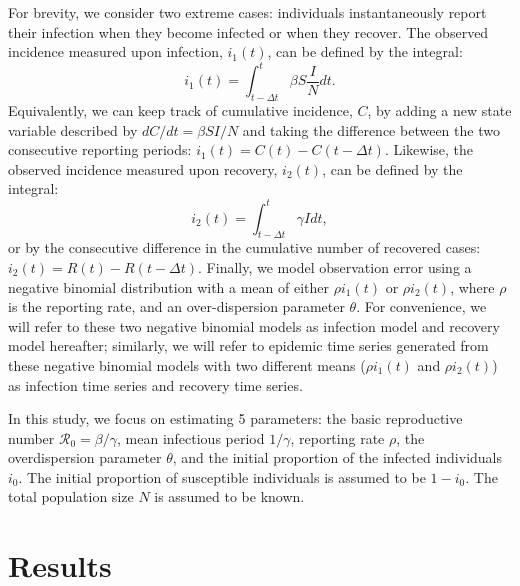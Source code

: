 \documentclass[12pt]{article}\usepackage[]{graphicx}\usepackage[]{color}
\begin{document}
For brevity, we consider two extreme cases: individuals instantaneously report
their infection when they become infected or when they recover. The observed incidence 
measured upon infection, $i_1(t)$, can be defined by the integral:
\begin{equation}
i_1(t) = \int_{t - \Delta t}^{t} \beta S \frac{I}{N} dt.
\end{equation}
Equivalently, we can keep track of cumulative incidence, $C$, by adding a 
new state variable described by $dC/dt = \beta S I/N$ and taking the difference between 
the two consecutive reporting periods: $i_1(t) = C(t) - C(t-\Delta t)$. Likewise, 
the observed incidence measured upon recovery, $i_2(t)$, can be defined by the integral:
\begin{equation}
i_2(t) = \int_{t-\Delta t}^{t} \gamma I dt,
\end{equation}
or by the consecutive difference in the cumulative number of recovered cases:
$i_2(t) = R(t) - R(t - \Delta t)$.
Finally, we model observation error using a negative binomial distribution with a
mean of either $\rho i_1(t)$ or $\rho i_2(t)$, where $\rho$ is the reporting rate, and
an over-dispersion parameter $\theta$. For convenience, we will refer to these two
negative binomial models as infection model and recovery model hereafter; 
similarly, we will refer to epidemic time series generated from these
negative binomial models with two different means ($\rho i_1(t)$ and $\rho i_2(t)$)
as infection time series and recovery time series.

In this study, we focus on estimating 5 parameters: the basic reproductive
number $\mathcal R_0 = \beta/\gamma$, mean infectious period $1/\gamma$, 
reporting rate $\rho$, the overdispersion parameter $\theta$, and the initial
proportion of the infected individuals $i_0$. The initial proportion of
susceptible individuals is assumed to be $1 - i_0$. The total population
size $N$ is assumed to be known.

\section{Results}
\end{document}
